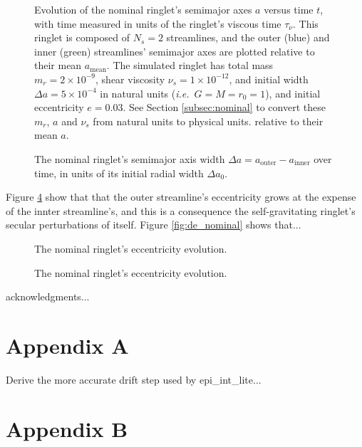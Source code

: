 \documentclass[preprint]{aastex62}
\begin{document}
\begin{figure}
\caption{Evolution of the nominal ringlet's semimajor axes $a$ versus time $t$, with time measured
in units of the ringlet's viscous time $\tau_\nu$. This ringlet is composed of $N_s=2$ streamlines,
and the outer (blue) and inner (green) streamlines' semimajor axes are plotted relative
to their mean $a_{\text{mean}}$. 
The simulated ringlet has total mass $m_r=2\times10^{-9}$, shear viscosity $\nu_s=1\times10^{-12}$,
and initial width $\Delta a = 5\times10^{-4}$ in natural units ({\it i.e.}\ $G=M=r_0=1$),
and initial eccentricity $e=0.03$. See Section \ref{subsec:nominal} to convert
these $m_r$, $a$ and $\nu_s$ from natural units to physical units.
relative to their mean $a$.
\label{fig:a_nominal}}
\end{figure}

\begin{figure}
\caption{
\label{fig:da_nominal}
The nominal ringlet's semimajor axis width $\Delta a = a_{\text{outer}} - a_{\text{inner}}$ over time, 
in units of its initial radial width $\Delta a_0$.}
\end{figure}

Figure \ref{fig:e_nominal} show that that the outer streamline's eccentricity grows at the
expense of the innter streamline's, and this is a consequence the self-gravitating ringlet's
secular perturbations of itself.  Figure \ref{fig:de_nominal} shows that...

\begin{figure}
\caption{
\label{fig:e_nominal}
The nominal ringlet's eccentricity evolution.}
\end{figure}

\begin{figure}
\caption{
\label{fig:e_nominal}
The nominal ringlet's eccentricity evolution.}
\end{figure}


\acknowledgments

acknowledgments...

\appendix

\section{Appendix A}
\label{sec:Appendix A}

Derive the more accurate drift step used by epi\_int\_lite...

\section{Appendix B}
\label{sec:Appendix B}
\end{document}
